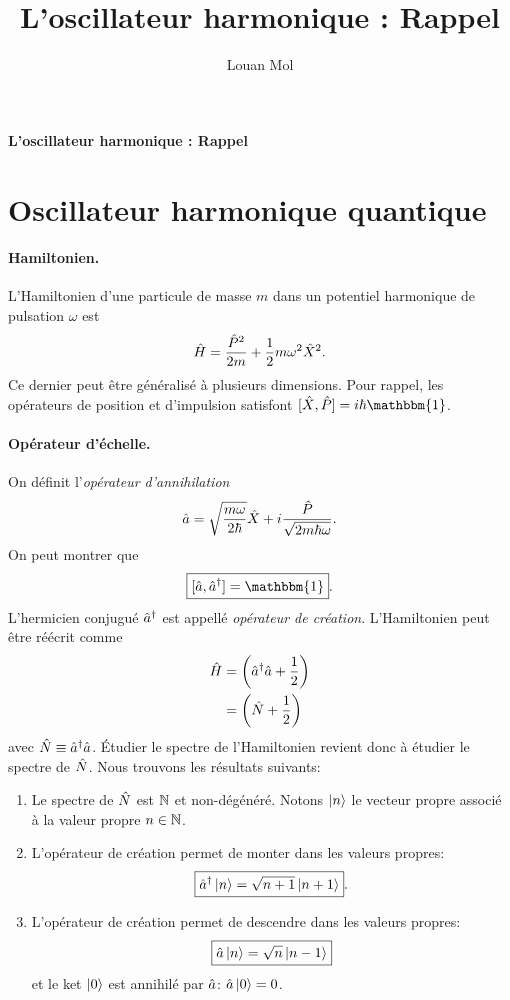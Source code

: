\documentclass[11pt,a4paper,oneside]{article}
\title{L'oscillateur harmonique : Rappel}
\author{Louan Mol}
\begin{document}
\begin{center}
    {\huge \textbf{L'oscillateur harmonique : Rappel}}
\end{center}

\section{Oscillateur harmonique quantique}

\paragraph*{Hamiltonien.} L'Hamiltonien d'une particule de masse $m$ dans un potentiel harmonique de pulsation $\omega$ est
\begin{equation*}
    \hat{H} = \frac{\hat{P}^2}{2m}+\frac{1}{2}m\omega^2\hat{X}^2.
\end{equation*}
Ce dernier peut être généralisé à plusieurs dimensions. Pour rappel, les opérateurs de position et d'impulsion satisfont $[\hX,\hP]=i\hbar\mathbbm{1}$.

\paragraph*{Opérateur d'échelle.} On définit l'\emph{opérateur d'annihilation}
\begin{eqnarray}
    \hat{a} = \sqrt{\frac{m\omega}{2\hbar}}\hat{X}+i\frac{\hat{P}}{\sqrt{2m\hbar\omega}}.
\end{eqnarray}
On peut montrer que
\begin{equation*}
    \boxed{[\ha,\ha^\dagger]=\mathbbm{1}}.
\end{equation*}
L'hermicien conjugué $\hat{a}^\dagger$ est appellé \emph{opérateur de création}. L'Hamiltonien peut être réécrit comme
\begin{align}
    \hat{H} &= \left(\hat{a}^\dagger\hat{a}+\frac{1}{2}\right)\\
    &= \left(\hat{N}+\frac{1}{2}\right)
\end{align}
avec $\hat{N}\equiv\hat{a}^\dagger\hat{a}$. Étudier le spectre de l'Hamiltonien revient donc à étudier le spectre de $\hat{N}$. Nous trouvons les résultats suivants:
\begin{enumerate}[label=\roman*)]
    \item Le spectre de $\hat{N}$ est $\mathbb{N}$ et non-dégénéré. Notons $\ket{n}$ le vecteur propre associé à la valeur propre $n\in\mathbb{N}$.
    \item L'opérateur de création permet de monter dans les valeurs propres:
    \begin{equation*}
        \boxed{\hat{a}^\dagger\ket{n}=\sqrt{n+1}\ket{n+1}}.
    \end{equation*}
    \item L'opérateur de création permet de descendre dans les valeurs propres:
    \begin{equation*}
        \boxed{\hat{a}\ket{n}=\sqrt{n}\ket{n-1}}
    \end{equation*}
    et le ket $\ket{0}$ est annihilé par $\hat{a}$: $\hat{a}\ket{0}=0$.
\end{enumerate}
\end{document}

